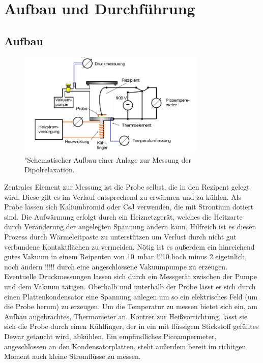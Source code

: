 \section{Aufbau und Durchführung}
\subsection{Aufbau}
\begin{figure}
    \centering
    \includegraphics[width=0.8\textwidth]{bilder/Aufbau.png}
    \caption{"Schematischer Aufbau einer Anlage zur Messung der Dipolrelaxation.
            \cite{skript}}
    \label{fig:aufbau}
\end{figure}

Zentrales Element zur Messung ist die Probe selbst, die in den Rezipent gelegt wird. Diese gilt es im Verlauf entsprechend
zu erwärmen und zu kühlen. Als Probe lassen sich Kaliumbromid oder CsJ verwenden, die mit Strontium
dotiert sind. Die Aufwärmung erfolgt durch ein Heiznetzgerät, welches die Heitzarte durch Veränderung der angelegten Spannung ändern kann.
Hilfreich ist es diesen Prozess durch Wärmeleitpaste zu unterstützen um
Verlust durch nicht gut verbundene Kontaktflächen zu vermeiden.
Nötig ist es außerdem ein hinreichend gutes Vakuum in einem Reipenten von \SI{10}{\milli\bar} !!!10 hoch minus 2 eigetnlich, noch ändern !!!!! 
durch eine angeschlossene Vakuumpumpe zu erzeugen.
Eventuelle Druckmessungen  lassen sich durch ein Messgerät zwischen der Pumpe und dem Vakuum tätigen.
Oberhalb und unterhalb der Probe lässt es sich durch einen Plattenkondensator eine Spannung anlegen um so ein 
elektrisches Feld (um die Probe herum) zu erzeugen. Um die Temperatur zu messen bietet sich ein, am Aufbau angebrachtes, Thermometer an.
Kontrer zur Heißvorrichtung, lässt sie sich die Probe durch einen Kühlfinger, der in ein mit flüssigem Stickstoff gefülltes Dewar getaucht wird, 
abkühlen.
Ein empfindliches Picoampermeter, angeschlossen an den Kondensatorplatten, steht außerdem bereit im richitgen Moment auch kleine
Stromflüsse zu messen.

